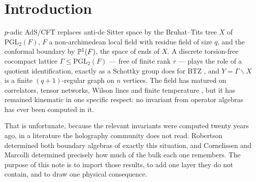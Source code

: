 \section{Introduction}\label{Holo1:sec:intro}

$p$-adic AdS/CFT \cite{GKPSW,HMSS} replaces anti-de Sitter space by the Bruhat--Tits tree
$X$ of $\mathrm{PGL}_2(F)$, $F$ a non-archimedean local field with residue field of size
$q$, and the conformal boundary by $\mathbb{P}^1(F)$, the space of ends of $X$. A discrete
torsion-free cocompact lattice $\Gamma\le\mathrm{PGL}_2(F)$ --- free of finite rank $r$ ---
plays the role of a quotient identification, exactly as a Schottky group does for BTZ
\cite{HuangJepsen}, and $Y=\Gamma\backslash X$ is a finite $(q{+}1)$-regular graph on $n$
vertices. The field has matured on correlators, tensor networks, Wilson lines and finite
temperature \cite{GubserParikh,Marcolli20,HuangJepsen,Mondal}, but it has remained
kinematic in one specific respect: no invariant from operator algebras has ever been
computed in it.

That is unfortunate, because the relevant invariants were computed twenty years ago, in a
literature the holography community does not read. Robertson \cite{Rob05} determined both
boundary algebras of exactly this situation, and Cornelissen and Marcolli \cite{CM13}
determined precisely how much of the bulk each one remembers. The purpose of this note is
to import those results, to add one layer they do not contain, and to draw one physical
consequence.

